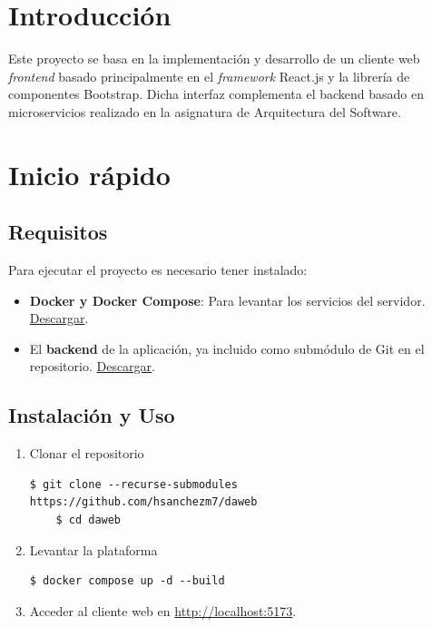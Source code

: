 \documentclass[11pt]{article}
\begin{document}
\section{Introducción}

  Este proyecto se basa en la implementación y desarrollo de un cliente web
  \textit{frontend} basado principalmente en el \textit{framework} React.js y la
  librería de componentes Bootstrap. Dicha interfaz complementa el backend basado
  en microservicios realizado en la asignatura de Arquitectura del Software.

\section{Inicio rápido}

  \subsection{Requisitos}

      Para ejecutar el proyecto es necesario tener instalado:

      \begin{itemize}
          \item \textbf{Docker y Docker Compose}: Para levantar los servicios del servidor. \href{https://www.docker.com}{Descargar}.
          \item El \textbf{backend} de la aplicación, ya incluido como submódulo de Git en el
                repositorio. \href{https://github.com/hsanchezm7/arso}{Descargar}.
      \end{itemize}

  \subsection{Instalación y Uso}

      \begin{enumerate}
          \item Clonar el repositorio

                \begin{lstlisting}[style=BashStyle, numbers=none]
    $ git clone --recurse-submodules https://github.com/hsanchezm7/daweb
    $ cd daweb
\end{lstlisting}

          \item Levantar la plataforma

                \begin{lstlisting}[style=BashStyle, numbers=none]
    $ docker compose up -d --build
\end{lstlisting}

          \item Acceder al cliente web en \href{http://localhost:5173}{http://localhost:5173}.
      \end{enumerate}
\end{document}
